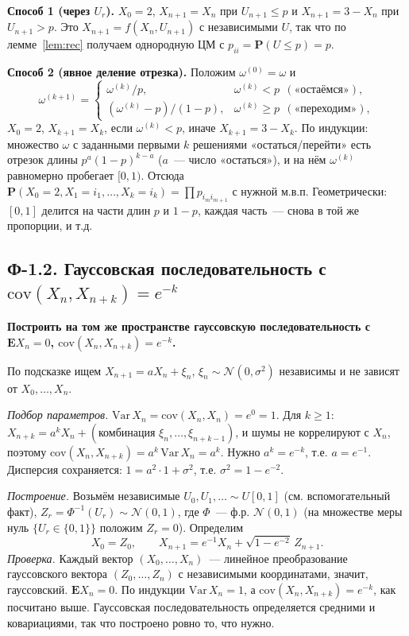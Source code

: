 \documentclass[11pt,a4paper]{article}
\theoremstyle{definition}
\newcommand{\PP}{\mathbf P}
\newcommand{\EE}{\mathbf E}
\newcommand{\1}{\mathbf 1}
\newenvironment{task}[1]{\par\medskip\noindent\colorbox{black!7}{\parbox{\dimexpr\linewidth-2\fboxsep}{\textbf{#1}}}\par\smallskip}{\par}
\begin{document}
\textbf{Способ 1 (через $U_r$).} $X_0=2$,
$X_{n+1}=X_n$ при $U_{n+1}\le p$ и $X_{n+1}=3-X_n$ при $U_{n+1}>p$. Это
$X_{n+1}=f(X_n,U_{n+1})$ с независимыми $U$, так что по лемме~\ref{lem:rec}
получаем однородную ЦМ с $p_{ii}=\PP(U\le p)=p$.

\textbf{Способ 2 (явное деление отрезка).} Положим $\omega^{(0)}=\omega$ и
\[
\omega^{(k+1)}=\begin{cases}\omega^{(k)}/p,&\omega^{(k)}<p\ \ (\text{«остаёмся»}),\\
(\omega^{(k)}-p)/(1-p),&\omega^{(k)}\ge p\ \ (\text{«переходим»}),\end{cases}
\]
$X_0=2$, $X_{k+1}=X_k$, если $\omega^{(k)}<p$, иначе $X_{k+1}=3-X_k$. По
индукции: множество $\omega$ с заданными первыми $k$ решениями
«остаться/перейти» есть отрезок длины $p^a(1-p)^{k-a}$ ($a$~--- число
«остаться»), и на нём $\omega^{(k)}$ равномерно пробегает $[0,1)$. Отсюда
$\PP(X_0=2,X_1=i_1,\dots,X_k=i_k)=\prod p_{i_{m}i_{m+1}}$ с нужной м.в.п. Геометрически:
$[0,1]$ делится на части длин $p$ и $1-p$, каждая часть~--- снова в той же
пропорции, и т.д.

\subsection{Ф-1.2. Гауссовская последовательность с $\mathrm{cov}(X_n,X_{n+k})=e^{-k}$}

\begin{task}{Построить на том же пространстве гауссовскую последовательность с
$\EE X_n=0$, $\mathrm{cov}(X_n,X_{n+k})=e^{-k}$.}
\end{task}
По подсказке ищем $X_{n+1}=aX_n+\xi_n$, $\xi_n\sim\mathcal N(0,\sigma^2)$
независимы и не зависят от $X_0,\dots,X_n$.

\emph{Подбор параметров.} $\mathrm{Var}\,X_n=\mathrm{cov}(X_n,X_n)=e^0=1$.
Для $k\ge1$: $X_{n+k}=a^kX_n+(\text{комбинация }\xi_n,\dots,\xi_{n+k-1})$, и
шумы не коррелируют с $X_n$, поэтому
$\mathrm{cov}(X_n,X_{n+k})=a^k\,\mathrm{Var}\,X_n=a^k$. Нужно $a^k=e^{-k}$,
т.е. $a=e^{-1}$. Дисперсия сохраняется: $1=a^2\cdot1+\sigma^2$, т.е.
$\sigma^2=1-e^{-2}$.

\emph{Построение.} Возьмём независимые $U_0,U_1,\dots\sim U[0,1]$ (см.
вспомогательный факт), $Z_r=\Phi^{-1}(U_r)\sim\mathcal N(0,1)$, где
$\Phi$~--- ф.р. $\mathcal N(0,1)$ (на множестве меры нуль $\{U_r\in\{0,1\}\}$
положим $Z_r=0$). Определим
\[
X_0=Z_0,\qquad X_{n+1}=e^{-1}X_n+\sqrt{1-e^{-2}}\,Z_{n+1}.
\]
\emph{Проверка.} Каждый вектор $(X_0,\dots,X_n)$~--- линейное преобразование
гауссовского вектора $(Z_0,\dots,Z_n)$ с независимыми координатами, значит,
гауссовский. $\EE X_n=0$. По индукции $\mathrm{Var}\,X_n=1$, а
$\mathrm{cov}(X_n,X_{n+k})=e^{-k}$, как посчитано выше. Гауссовская
последовательность определяется средними и ковариациями, так что построено ровно
то, что нужно.
\end{document}
